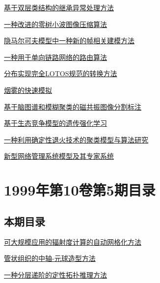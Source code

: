 \documentclass[a4paper]{article}
\begin{document}
\href{http://www.jos.org.cn/ch/reader/download_pdf.aspx?file_no=19990611&year_id=1999&quarter_id=6&falg=1}{基于双层类结构的继承异常处理方法}

\href{http://www.jos.org.cn/ch/reader/download_pdf.aspx?file_no=19990612&year_id=1999&quarter_id=6&falg=1}{一种改进的零树小波图像压缩算法}

\href{http://www.jos.org.cn/ch/reader/download_pdf.aspx?file_no=19990613&year_id=1999&quarter_id=6&falg=1}{隐马尔可夫模型中一种新的帧相关建模方法}

\href{http://www.jos.org.cn/ch/reader/download_pdf.aspx?file_no=19990614&year_id=1999&quarter_id=6&falg=1}{一种用于单向链路网络的路由算法}

\href{http://www.jos.org.cn/ch/reader/download_pdf.aspx?file_no=19990615&year_id=1999&quarter_id=6&falg=1}{分布实现完全LOTOS规范的转换方法}

\href{http://www.jos.org.cn/ch/reader/download_pdf.aspx?file_no=19990616&year_id=1999&quarter_id=6&falg=1}{烟雾的快速模拟}

\href{http://www.jos.org.cn/ch/reader/download_pdf.aspx?file_no=19990617&year_id=1999&quarter_id=6&falg=1}{基于脑图谱和模糊聚类的磁共振图像分割标注}

\href{http://www.jos.org.cn/ch/reader/download_pdf.aspx?file_no=19990618&year_id=1999&quarter_id=6&falg=1}{基于生态竞争模型的遗传强化学习}

\href{http://www.jos.org.cn/ch/reader/download_pdf.aspx?file_no=19990619&year_id=1999&quarter_id=6&falg=1}{一种利用确定性退火技术的聚类模型与算法研究}

\href{http://www.jos.org.cn/ch/reader/download_pdf.aspx?file_no=19990620&year_id=1999&quarter_id=6&falg=1}{新型网络管理系统模型及其专家系统}


\section{\textbf{1999年第10卷第5期目录}}
\subsection{本期目录}
\href{http://www.jos.org.cn/ch/reader/download_pdf.aspx?file_no=19990501&year_id=1999&quarter_id=5&falg=1}{可大规模应用的辐射度计算的自动网格化方法}

\href{http://www.jos.org.cn/ch/reader/download_pdf.aspx?file_no=19990502&year_id=1999&quarter_id=5&falg=1}{管状组织的中轴-元球造型方法}

\href{http://www.jos.org.cn/ch/reader/download_pdf.aspx?file_no=19990503&year_id=1999&quarter_id=5&falg=1}{一种分层递阶的定性拓扑推理方法}
\end{document}
